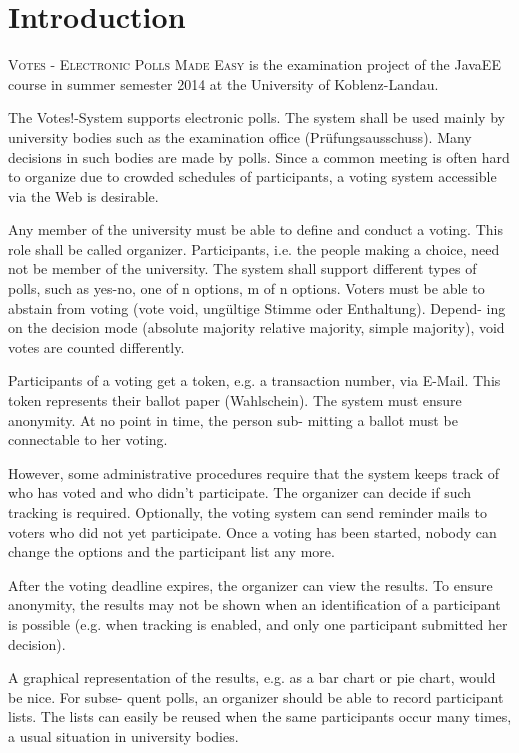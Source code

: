 \section{Introduction}
\textsc{Votes - Electronic Polls Made Easy} is the examination project of the JavaEE course in summer semester 2014 at the University of Koblenz-Landau.

The Votes!-System supports electronic polls. The system shall be used mainly by university bodies
such as the examination office (Prüfungsausschuss). Many decisions in such bodies are made by
polls. Since a common meeting is often hard to organize due to crowded schedules of participants,
a voting system accessible via the Web is desirable.

Any member of the university must be able to define and conduct a voting. This role shall be called
organizer. Participants, i.e. the people making a choice, need not be member of the university.
The system shall support different types of polls, such as yes-no, one of n options, m of n options.
Voters must be able to abstain from voting (vote void, ungültige Stimme oder Enthaltung). Depend-
ing on the decision mode (absolute majority relative majority, simple majority), void votes are counted
differently.

Participants of a voting get a token, e.g. a transaction number, via E-Mail. This token represents their
ballot paper (Wahlschein). The system must ensure anonymity. At no point in time, the person sub-
mitting a ballot must be connectable to her voting.

However, some administrative procedures require that the system keeps track of who has voted and
who didn’t participate. The organizer can decide if such tracking is required. Optionally, the voting
system can send reminder mails to voters who did not yet participate.
Once a voting has been started, nobody can change the options and the participant list any more.

After the voting deadline expires, the organizer can view the results. To ensure anonymity, the results
may not be shown when an identification of a participant is possible (e.g. when tracking is enabled,
and only one participant submitted her decision).

A graphical representation of the results, e.g. as a bar chart or pie chart, would be nice. For subse-
quent polls, an organizer should be able to record participant lists. The lists can easily be reused
when the same participants occur many times, a usual situation in university bodies.